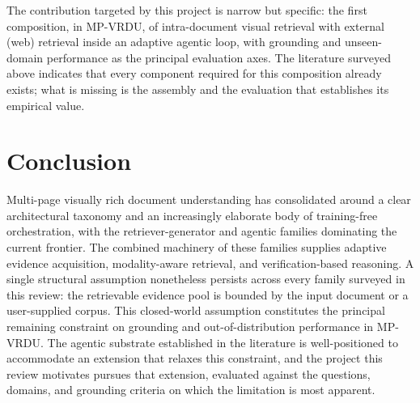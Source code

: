 \documentclass[11pt]{article}
\begin{document}
The contribution targeted by this project is narrow but specific: the first composition, in MP-VRDU, of intra-document visual retrieval with external (web) retrieval inside an adaptive agentic loop, with grounding and unseen-domain performance as the principal evaluation axes. The literature surveyed above indicates that every component required for this composition already exists; what is missing is the assembly and the evaluation that establishes its empirical value.

\section{Conclusion}

Multi-page visually rich document understanding has consolidated around a clear architectural taxonomy and an increasingly elaborate body of training-free orchestration, with the retriever-generator and agentic families dominating the current frontier. The combined machinery of these families supplies adaptive evidence acquisition, modality-aware retrieval, and verification-based reasoning. A single structural assumption nonetheless persists across every family surveyed in this review: the retrievable evidence pool is bounded by the input document or a user-supplied corpus. This closed-world assumption constitutes the principal remaining constraint on grounding and out-of-distribution performance in MP-VRDU. The agentic substrate established in the literature is well-positioned to accommodate an extension that relaxes this constraint, and the project this review motivates pursues that extension, evaluated against the questions, domains, and grounding criteria on which the limitation is most apparent.



\appendix
\end{document}
